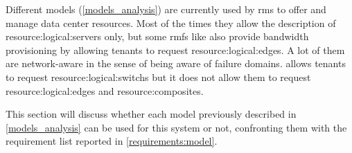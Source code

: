 Different \glspl{model} (\autoref{models_analysis}) are currently used by \glspl{rm} to offer and manage data center resources.
Most of the times they allow the description of \glspl{resource:logical:server} only, but some \glspl{rmf} like \cite{kraken, cloudmirror, oktopus} also provide bandwidth provisioning by allowing tenants to request \glspl{resource:logical:edge}.
A lot of them are network-aware in the sense of being aware of failure domains.
\cite{ontackling} allows tenants to request \glspl{resource:logical:switch} but it does not allow them to request \glspl{resource:logical:edge} and \glspl{resource:composite}.

This section will discuss whether each \gls{model} previously described in \autoref{models_analysis} can be used for this system or not, confronting them with the requirement list reported in \autoref{requirements:model}.